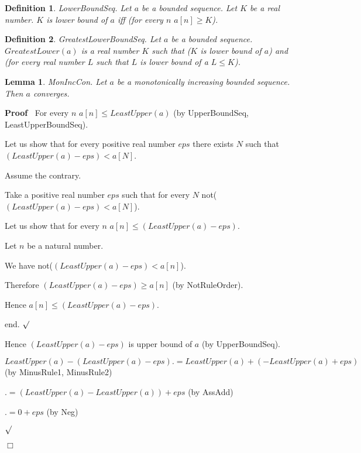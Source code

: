 \documentclass{article}
\newenvironment{forthel}{\begin{leftbar}}{\end{leftbar}}
\newenvironment{proof}{\noindent\textbf{Proof\ }}{\hspace*{\fill}$\Box$\medskip}
\newenvironment{subproof}{\begin{list}{}{}
		\item[\text{Proof}]}{\hfill $\surd$ \end{list}}
\newtheorem{lemma}{Lemma}
\newtheorem{definition}{Definition}
\begin{document}
\begin{forthel}
	\begin{definition}
		LowerBoundSeq.
		Let $a$ be a bounded sequence. Let $K$ be a real number. $K$ is lower bound of $a$ iff (for every $n$ $a[n] \geq K$).
	\end{definition}
	
	\begin{definition}
		GreatestLowerBoundSeq.
		Let $a$ be a bounded sequence. $GreatestLower(a)$ is a real number $K$ such that ($K$ is lower bound of $a$) and
		(for every real number $L$ such that $L$ is lower bound of a $L \leq K$).
	\end{definition}
	
	\begin{lemma}
		MonIncCon.
		Let $a$ be a monotonically increasing bounded sequence. Then $a$ converges.
	\end{lemma}

	\begin{proof}
		For every $n$ $a[n] \leq LeastUpper(a)$ (by UpperBoundSeq, LeastUpperBoundSeq).
		
		Let us show that for every positive real number $eps$ there exists $N$ such that $(LeastUpper(a) - eps) < a[N]$.
		
		\begin{subproof}
			Assume the contrary.
			
			Take a positive real number $eps$ such that for every $N$ not($(LeastUpper(a) - eps) < a[N]$).
			
			Let us show that for every $n$ $a[n] \leq (LeastUpper(a) - eps)$.
			
			\begin{subproof}
				Let $n$ be a natural number.
				
				We have not($(LeastUpper(a) - eps) < a[n]$).
				
				Therefore $(LeastUpper(a) - eps) \geq a[n]$ (by NotRuleOrder).
				
				Hence $a[n] \leq (LeastUpper(a) - eps)$.
				
				end.
			\end{subproof}
			
			Hence $(LeastUpper(a) - eps)$ is upper bound of $a$ (by UpperBoundSeq).
			
			$LeastUpper(a) - (LeastUpper(a) - eps) .= LeastUpper(a) + (-LeastUpper(a) + eps)$ (by MinusRule1, MinusRule2)
			
			$.= (LeastUpper(a) - LeastUpper(a)) + eps$ (by AssAdd)
			
			$.= 0 + eps$ (by Neg)
			

\end{subproof}
\end{proof}
\end{forthel}
\end{document}
